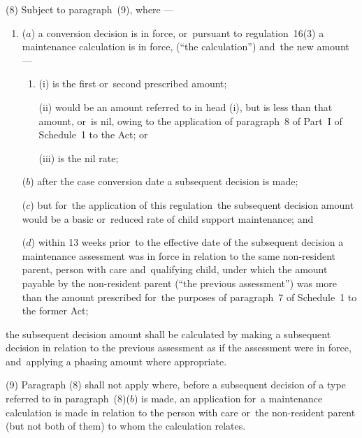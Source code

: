 \documentclass[12pt,a4paper]{article}
\begin{document}
(8) 
Subject to paragraph~(9), where%
—
\begin{enumerate}\item[]

($a$) a 
conversion decision  %
is in force, or~pursuant to regulation~16(3) a maintenance calculation is in force, (“the calculation”) and~the new amount—
\begin{enumerate}\item[]
(i) is the first or~second prescribed amount;

(ii) would be an amount referred to in head (i), but is less than that amount, or~is nil, owing to the application of paragraph~8 of Part~I of Schedule~1 to the Act; or

(iii) is the nil rate;
\end{enumerate}

($b$) after the case conversion date a subsequent decision is made;

($c$) but for~the application of this regulation~the subsequent decision amount would be a basic or~reduced rate of child support maintenance; and

($d$) within 13 weeks prior~to the effective date of the subsequent decision a maintenance assessment was in force in relation to the same non-resident parent, person with care and~qualifying child, under which the amount payable by the non-resident parent (“the previous assessment”) was more than the amount prescribed for~the purposes of paragraph~7 of Schedule~1 to the former Act;
\end{enumerate}
the subsequent decision amount shall be calculated by making a subsequent decision in relation to the previous assessment as if the assessment were in force, and~applying a phasing amount where appropriate.

(9) Paragraph (8) shall not apply where, before a subsequent decision of a type referred to in paragraph~(8)($b$)  is made, an application for~a maintenance calculation is made 
in relation to the person with care or~the non-resident parent (but not both of them) to whom the calculation relates.
\end{document}
